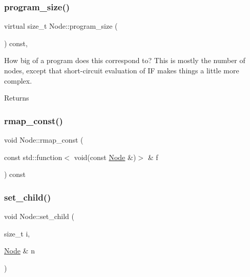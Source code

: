 \subsubsection{\texorpdfstring{program\+\_\+size()}{program\_size()}}
{\footnotesize\ttfamily virtual size\+\_\+t Node\+::program\+\_\+size (\begin{DoxyParamCaption}{ }\end{DoxyParamCaption}) const\hspace{0.3cm}{\ttfamily [inline]}, {\ttfamily [virtual]}}

How big of a program does this correspond to? This is mostly the number of nodes, except that short-\/circuit evaluation of IF makes things a little more complex. \begin{DoxyReturn}{Returns}

\end{DoxyReturn}
\mbox{\label{class_node_a59da25cea338385d73b898b86492f97e}} 
\subsubsection{\texorpdfstring{rmap\+\_\+const()}{rmap\_const()}}
{\footnotesize\ttfamily void Node\+::rmap\+\_\+const (\begin{DoxyParamCaption}\item[{const std\+::function$<$ void(const \hyperlink{class_node}{Node} \&)$>$ \&}]{f }\end{DoxyParamCaption}) const\hspace{0.3cm}{\ttfamily [inline]}}

\mbox{\label{class_node_afff50c3712b8e30fffd479cad4eee023}} 
\subsubsection{\texorpdfstring{set\+\_\+child()}{set\_child()}\hspace{0.1cm}{\footnotesize\ttfamily [1/2]}}
{\footnotesize\ttfamily void Node\+::set\+\_\+child (\begin{DoxyParamCaption}\item[{size\+\_\+t}]{i,  }\item[{\hyperlink{class_node}{Node} \&}]{n }\end{DoxyParamCaption})\hspace{0.3cm}{\ttfamily [inline]}}


